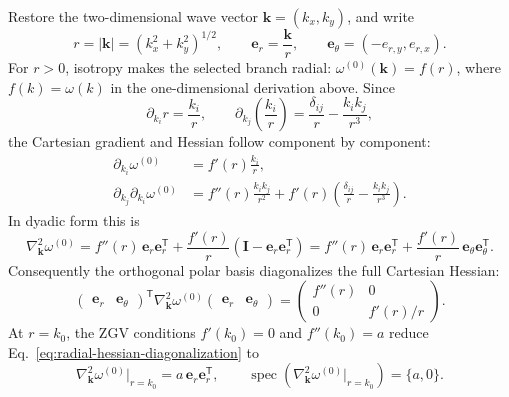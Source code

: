 Restore the two-dimensional wave vector
\(
  \mathbf{k}=(k_x,k_y)
\), and write
\begin{equation}
  r=|\mathbf{k}|=(k_x^2+k_y^2)^{1/2},
  \qquad
  \mathbf{e}_r=\frac{\mathbf{k}}{r},
  \qquad
  \mathbf{e}_\theta=(-e_{r,y},e_{r,x}).
  \label{eq:polar-wavevector-basis}
\end{equation}
For \(r>0\), isotropy makes the selected branch radial:
\(
  \omega^{(0)}(\mathbf{k})=f(r)
\), where \(f(k)=\omega(k)\) in the one-dimensional derivation above.  Since
\begin{equation}
  \partial_{k_i}r=\frac{k_i}{r},
  \qquad
  \partial_{k_j}\left(\frac{k_i}{r}\right)
  =\frac{\delta_{ij}}{r}-\frac{k_i k_j}{r^3},
  \label{eq:radial-coordinate-derivatives}
\end{equation}
the Cartesian gradient and Hessian follow component by component:
\begin{align}
  \partial_{k_i}\omega^{(0)}
  &=f'(r)\frac{k_i}{r},                                               \label{eq:radial-cartesian-gradient}\\
  \partial_{k_j}\partial_{k_i}\omega^{(0)}
  &=f''(r)\frac{k_i k_j}{r^2}
    +f'(r)\left(\frac{\delta_{ij}}{r}
                 -\frac{k_i k_j}{r^3}\right).                        \label{eq:radial-cartesian-hessian-components}
\end{align}
In dyadic form this is
\begin{equation}
  \nabla_{\mathbf{k}}^2\omega^{(0)}
  =f''(r)\,\mathbf{e}_r\mathbf{e}_r^{\mathsf T}
   +\frac{f'(r)}{r}
    \left(\mathbf{I}-\mathbf{e}_r\mathbf{e}_r^{\mathsf T}\right)
  =f''(r)\,\mathbf{e}_r\mathbf{e}_r^{\mathsf T}
   +\frac{f'(r)}{r}\,\mathbf{e}_\theta\mathbf{e}_\theta^{\mathsf T}.
  \label{eq:radial-cartesian-hessian}
\end{equation}
Consequently the orthogonal polar basis diagonalizes the full Cartesian
Hessian:
\begin{equation}
  \begin{pmatrix}\mathbf{e}_r&\mathbf{e}_\theta\end{pmatrix}^{\mathsf T}
  \nabla_{\mathbf{k}}^2\omega^{(0)}
  \begin{pmatrix}\mathbf{e}_r&\mathbf{e}_\theta\end{pmatrix}
  =\begin{pmatrix}
    f''(r)&0\\[2pt]
    0&f'(r)/r
  \end{pmatrix}.
  \label{eq:radial-hessian-diagonalization}
\end{equation}
At \(r=k_0\), the ZGV conditions \(f'(k_0)=0\) and \(f''(k_0)=a\) reduce
Eq.~\eqref{eq:radial-hessian-diagonalization} to
\begin{equation}
  \nabla_{\mathbf{k}}^2\omega^{(0)}\big|_{r=k_0}
  =a\,\mathbf{e}_r\mathbf{e}_r^{\mathsf T},
  \qquad
  \operatorname{spec}
  \left(\nabla_{\mathbf{k}}^2\omega^{(0)}\big|_{r=k_0}\right)
  =\{a,0\}.
  \label{eq:zgv-ring-hessian}
\end{equation}

